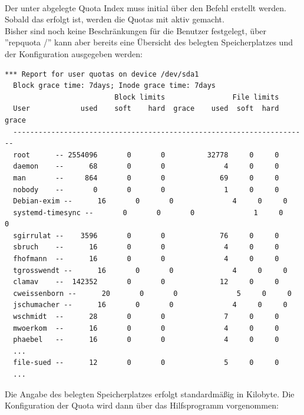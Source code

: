 \\

Der unter  abgelegte Quota Index muss initial über den
Befehl  erstellt werden. Sobald das erfolgt ist, werden
die Quotas mit  aktiv gemacht.\\

Bisher sind noch keine Beschränkungen für die Benutzer festgelegt, über
''repquota /'' kann aber bereits eine Übersicht des belegten Speicherplatzes
und der Konfiguration ausgegeben werden:\\

\begin{lstlisting}[label=code:quota1,caption=Quotasetup]
  *** Report for user quotas on device /dev/sda1
  Block grace time: 7days; Inode grace time: 7days
                          Block limits                File limits
  User            used    soft    hard  grace    used  soft  hard  grace
  ----------------------------------------------------------------------
  root      -- 2554096       0       0          32778     0     0
  daemon    --      68       0       0              4     0     0
  man       --     864       0       0             69     0     0
  nobody    --       0       0       0              1     0     0
  Debian-exim --      16       0       0              4     0     0
  systemd-timesync --       0       0       0              1     0     0
  sgirrulat --    3596       0       0             76     0     0
  sbruch    --      16       0       0              4     0     0
  fhofmann  --      16       0       0              4     0     0
  tgrosswendt --      16       0       0              4     0     0
  clamav    --  142352       0       0             12     0     0
  cweissenborn --      20       0       0              5     0     0
  jschumacher --      16       0       0              4     0     0
  wschmidt  --      28       0       0              7     0     0
  mwoerkom  --      16       0       0              4     0     0
  phaebel   --      16       0       0              4     0     0
  ...
  file-sued --      12       0       0              5     0     0
  ...
\end{lstlisting}

Die Angabe des belegten Speicherplatzes erfolgt standardmäßig in Kilobyte. Die
Konfiguration der Quota wird dann über das Hilfsprogramm 
vorgenommen:\\


